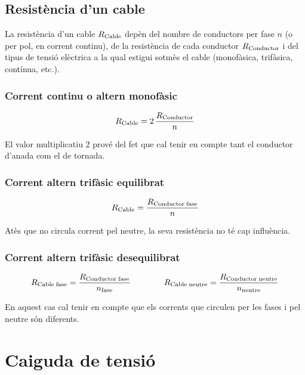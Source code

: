 \subsection{Resistència d'un cable}

La resistència d'un cable $R_\mathrm{Cable}$ depèn del nombre de conductors per fase $n$ (o
per pol, en corrent continu), de la resistència de cada conductor $R_\mathrm{Conductor}$ i del
tipus de tensió elèctrica a la qual estigui sotmès el cable (monofàsica, trifàsica,
contínua, etc.).

\subsubsection*{Corrent continu o altern monofàsic}
\begin{equation}\label{eq:r_cc_mono}
    R_\mathrm{Cable} = 2\, \frac{R_\mathrm{Conductor}}{n}
\end{equation}

El valor multiplicatiu 2 prové del fet que cal tenir en compte tant el conductor d'anada
com el de tornada.

\subsubsection*{Corrent altern trifàsic equilibrat}
\vspace{-5mm}
\begin{equation}\label{eq:r_trifas}
R_\mathrm{Cable} = \frac{R_\mathrm{Conductor\;fase}}{n}
\end{equation}

Atès que no circula corrent pel neutre, la seva resistència no  té cap influència.

\subsubsection*{Corrent altern trifàsic desequilibrat}
\begin{equation}
    R_\mathrm{Cable\;fase} = \frac{R_\mathrm{Conductor\;fase}}{n_\mathrm{fase}} \qquad\qquad
    R_\mathrm{Cable\; neutre} = \frac{R_\mathrm{Conductor\;neutre}}{n_\mathrm{neutre}}
\end{equation}

En aquest cas cal tenir en compte que els corrents que circulen per les fases i pel neutre
són diferents.


\section{Caiguda de tensió}

